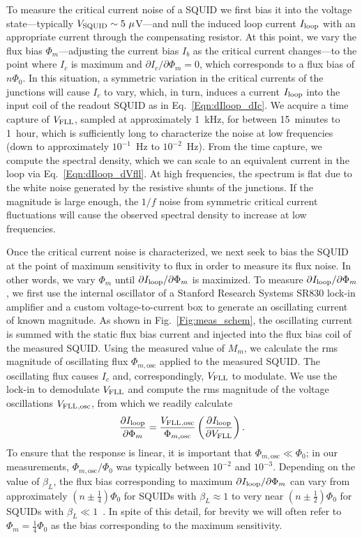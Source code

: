 To measure the critical current noise of a SQUID we first bias it into the voltage state---typically $V_\text{SQUID} \sim 5~\mu$V---and null the induced loop current $I_\text{loop}$ with an appropriate current through the compensating resistor. At this point, we vary the flux bias $\Phi_m$---adjusting the current bias $I_b$ as the critical current changes---to the point where $I_c$ is maximum and $\partial I_c/\partial \Phi_m = 0$, which corresponds to a flux bias of $n\Phi_0$. In this situation, a symmetric variation in the critical currents of the junctions will cause $I_c$ to vary, which, in turn, induces a current $I_\text{loop}$ into the input coil of the readout SQUID as in Eq.~\eqref{Eqn:dIloop_dIc}. We acquire a time capture of $V_\text{FLL}$, sampled at approximately 1~kHz, for between 15~minutes to 1~hour, which is sufficiently long to characterize the noise at low frequencies (down to approximately $10^{-1}$~Hz to $10^{-2}$~Hz). From the time capture, we compute the spectral density, which we can scale to an equivalent current in the loop via Eq.~\eqref{Eqn:dIloop_dVfll}. At high frequencies, the spectrum is flat due to the white noise generated by the resistive shunts of the junctions. If the magnitude is large enough, the $1/f$ noise from symmetric critical current fluctuations will cause the observed spectral density to increase at low frequencies.

Once the critical current noise is characterized, we next seek to bias the SQUID at the point of maximum sensitivity to flux in order to measure its flux noise. In other words, we vary $\Phi_m$ until $\partial I_\text{loop}/\partial\Phi_m$ is maximized. To measure $\partial I_\text{loop}/\partial\Phi_m$, we first use the internal oscillator of a Stanford Research Systems SR830 lock-in amplifier and a custom voltage-to-current box to generate an oscillating current of known magnitude. As shown in Fig.~\ref{Fig:meas_schem}, the oscillating current is summed with the static flux bias current and injected into the flux bias coil of the measured SQUID. Using the measured value of $M_m$, we calculate the rms magnitude of oscillating flux $\Phi_{m,\text{osc}}$ applied to the measured SQUID. The oscillating flux causes $I_c$ and, correspondingly, $V_\text{FLL}$ to modulate. We use the lock-in to demodulate $V_\text{FLL}$ and compute the rms magnitude of the voltage oscillations $V_\text{FLL}{}_{\text{,osc}}$, from which we readily calculate
\begin{align}\label{Eqn:dIloop_dPhim}
\frac{\partial\Iloop}{\partial\Phi_m} = \frac{\Vfll{}_{\text{,osc}}}{\Phi_{m,\text{osc}}} %
\left(\frac{\partial\Iloop}{\partial\Vfll}\right).
\end{align}
To ensure that the response is linear, it is important that $\Phi_{m,\text{osc}} \ll \Phi_0$; in our measurements, $\Phi_{m,\text{osc}}/\Phi_0$ was typically between $10^{-2}$ and $10^{-3}$. Depending on the value of $\beta_L$, the flux bias corresponding to maximum $\partial I_\text{loop}/\partial\Phi_m$ can vary from approximately $(n\pm\tfrac{1}{4})\Phi_0$ for SQUIDs with $\beta_L \approx 1$ to very near $(n\pm\tfrac{1}{2})\Phi_0$ for SQUIDs with $\beta_L \ll 1$~\citep{Tesche:JLTP:1977}. In spite of this detail, for brevity we will often refer to $\Phi_m = \tfrac{1}{4}\Phi_0$ as the bias corresponding to the maximum sensitivity.

